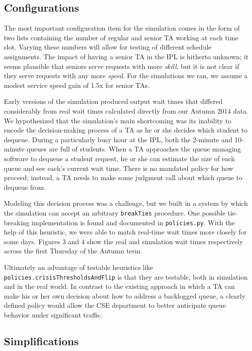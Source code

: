 \documentclass{article}
\begin{document}
\begin{multicols}{2}
\subsection*{Configurations}

The most important configuration item for the simulation comes in the form of two lists containing the number of regular and senior TA working at each time slot. Varying these numbers will allow for testing of different schedule assignments. The impact of having a senior TA in the IPL is hitherto unknown; it seems plausible that seniors serve requests with more \textit{skill}, but it is not clear if they serve requests with any more \textit{speed}. For the simulations we ran, we assume a modest service speed gain of 1.5x for senior TAs.

Early versions of the simulation produced output wait times that differed considerably from real wait times calculated directly from our Autumn 2014 data. We hypothesized that the simulation's main shortcoming was its inability to encode the decision-making process of a TA as he or she decides which student to dequeue. During a particularly busy hour at the IPL, both the 2-minute and 10-minute queues are full of students. When a TA approaches the queue managing software to dequeue a student request, he or she can estimate the size of each queue and see each's current wait time. There is no mandated policy for how proceed; instead, a TA needs to make some judgment call about which queue to dequeue from.

Modeling this decision process was a challenge, but we built in a system by which the simulation can accept an arbitrary \texttt{breakTies} procedure. One possible tie-breaking implementation is found and documented in \texttt{policies.py}. With the help of this heuristic, we were able to match real-time wait times more closely for some days. Figures 3 and 4 show the real and simulation wait times respectively across the first Thursday of the Autumn term.

Ultimately an advantage of testable heuristics like \texttt{policies.crisisThresholdsAndFlip} is that they are testable, both in simulation and in the real world. In contrast to the existing approach in which a TA can make his or her own decision about how to address a backlogged queue, a clearly defined policy would allow the CSE department to better anticipate queue behavior under significant traffic.

\subsection*{Simplifications}


\end{multicols}
\end{document}
